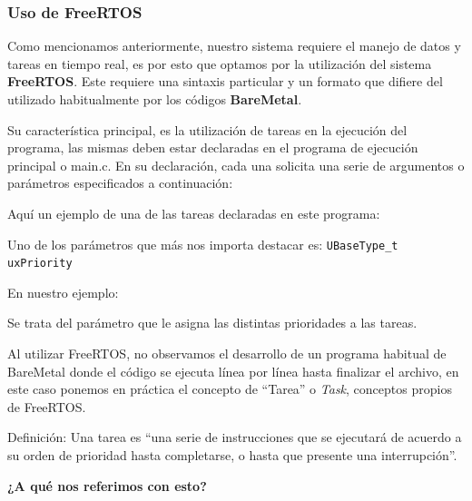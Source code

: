                 \subsubsection{Uso de FreeRTOS}
                    Como mencionamos anteriormente, nuestro sistema requiere el manejo de datos y tareas en tiempo real, es por esto que optamos por la utilización del sistema \textbf{FreeRTOS}. Este requiere una sintaxis particular y un formato que difiere del utilizado habitualmente por los códigos \textbf{BareMetal}.\par
                    Su característica principal, es la utilización de tareas en la ejecución del programa, las mismas deben estar declaradas en el programa de ejecución principal o main.c. En su declaración, cada una solicita una serie de argumentos o parámetros especificados a continuación:\par

                    
                    
                    Aquí un ejemplo de una de las tareas declaradas en este programa:\par
                    
                    \par

                    Uno de los parámetros que más nos importa destacar es: \texttt{UBaseType\_t uxPriority}\par
                    En nuestro ejemplo:\par
                    
                    \par
                    
                    Se trata del parámetro que le asigna las distintas prioridades a las tareas.\par
                    
                    Al utilizar FreeRTOS, no observamos el desarrollo de un programa habitual de BareMetal donde el código se ejecuta línea por línea hasta finalizar el archivo, en este caso ponemos en práctica el concepto de “Tarea” o \textit{Task}, conceptos propios de FreeRTOS.\par
                    Definición: Una tarea es “una serie de instrucciones que se ejecutará de acuerdo a su orden de prioridad hasta completarse, o hasta que presente una interrupción”.\par
                    \textbf{¿A qué nos referimos con esto?}\par

